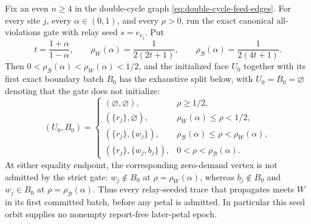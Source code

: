 \begin{proposition}
\label{prop:double-cycle-relay-seed-obstruction}
Fix an even $n\geq4$ in the double-cycle graph
\cref{eq:double-cycle-feed-edges}.  For every site $j$, every
$\alpha\in(0,1)$, and every $\rho>0$, run the exact canonical
all-violations gate with relay seed $s=e_{r_j}$.  Put
\begin{equation*}
 t=\frac{1+\alpha}{1-\alpha},\qquad
 \rho_W(\alpha)=\frac{1}{2(2t+1)},\qquad
 \rho_{\mathcal B}(\alpha)=\frac{1}{2(4t+1)}.
\end{equation*}
Then $0<\rho_{\mathcal B}(\alpha)<\rho_W(\alpha)<1/2$, and the
initialized face $U_0$ together with its first exact boundary batch $B_0$
has the exhaustive split below, with $U_0=B_0=\varnothing$ denoting that the
gate does not initialize:
\begin{equation}
 (U_0,B_0)=
 \begin{cases}
  (\varnothing,\varnothing),&\rho\geq1/2,\\
  (\{r_j\},\varnothing),&\rho_W(\alpha)\leq\rho<1/2,\\
  (\{r_j\},\{w_j\}),&\rho_{\mathcal B}(\alpha)\leq\rho<\rho_W(\alpha),\\
  (\{r_j\},\{w_j,b_j\}),&0<\rho<\rho_{\mathcal B}(\alpha).
 \end{cases}
 \label{eq:double-cycle-relay-first-batch}
\end{equation}
At either equality endpoint, the corresponding zero-demand vertex is not
admitted by the strict gate: $w_j\notin B_0$ at
$\rho=\rho_W(\alpha)$, whereas
$b_j\notin B_0$ and $w_j\in B_0$ at
$\rho=\rho_{\mathcal B}(\alpha)$.  Thus every relay-seeded trace that propagates
meets $W$ in its first committed batch, before any petal is admitted.  In
particular this seed orbit supplies no nonempty report-free later-petal
epoch.
\end{proposition}

